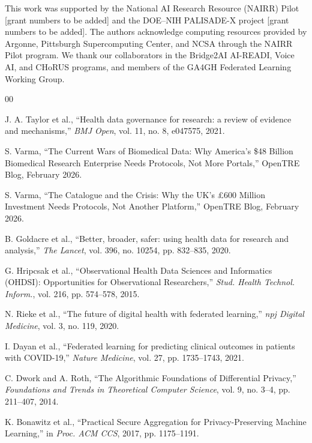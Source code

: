 \documentclass[conference]{IEEEtran}
\begin{document}
This work was supported by the National AI Research Resource (NAIRR) Pilot [grant numbers to be added] and the DOE--NIH PALISADE-X project [grant numbers to be added]. The authors acknowledge computing resources provided by Argonne, Pittsburgh Supercomputing Center, and NCSA through the NAIRR Pilot program. We thank our collaborators in the Bridge2AI AI-READI, Voice AI, and CHoRUS programs, and members of the GA4GH Federated Learning Working Group.

\begin{thebibliography}{00}

J. A. Taylor et al., ``Health data governance for research: a review of evidence and mechanisms,'' \emph{BMJ Open}, vol. 11, no. 8, e047575, 2021.

S. Varma, ``The Current Wars of Biomedical Data: Why America's \$48 Billion Biomedical Research Enterprise Needs Protocols, Not More Portals,'' OpenTRE Blog, February 2026.

S. Varma, ``The Catalogue and the Crisis: Why the UK's £600 Million Investment Needs Protocols, Not Another Platform,'' OpenTRE Blog, February 2026.

B. Goldacre et al., ``Better, broader, safer: using health data for research and analysis,'' \emph{The Lancet}, vol. 396, no. 10254, pp. 832--835, 2020.

G. Hripcsak et al., ``Observational Health Data Sciences and Informatics (OHDSI): Opportunities for Observational Researchers,'' \emph{Stud. Health Technol. Inform.}, vol. 216, pp. 574--578, 2015.

N. Rieke et al., ``The future of digital health with federated learning,'' \emph{npj Digital Medicine}, vol. 3, no. 119, 2020.

I. Dayan et al., ``Federated learning for predicting clinical outcomes in patients with COVID-19,'' \emph{Nature Medicine}, vol. 27, pp. 1735--1743, 2021.

C. Dwork and A. Roth, ``The Algorithmic Foundations of Differential Privacy,'' \emph{Foundations and Trends in Theoretical Computer Science}, vol. 9, no. 3--4, pp. 211--407, 2014.

K. Bonawitz et al., ``Practical Secure Aggregation for Privacy-Preserving Machine Learning,'' in \emph{Proc. ACM CCS}, 2017, pp. 1175--1191.


\end{thebibliography}
\end{document}
